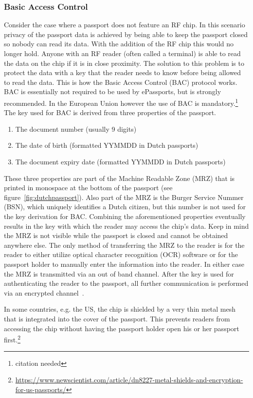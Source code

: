 \subsubsection{Basic Access Control}
Consider the case where a passport does not feature an RF chip. In this scenario privacy of the passport data is achieved by being able to keep the passport closed so nobody can read its data. With the addition of the RF chip this would no longer hold. Anyone with an RF reader (often called a terminal) is able to read the data on the chip if it is in close proximity. The solution to this problem is to protect the data with a key that the reader needs to know before being allowed to read the data. This is how the Basic Access Control (BAC) protocol works. BAC is essentially not required to be used by ePassports, but is strongly recommended. In the European Union however the use of BAC is mandatory.\footnote{citation needed} The key used for BAC is derived from three properties of the passport.
\begin{enumerate}
	\item The document number (usually 9 digits)
  \item The date of birth (formatted YYMMDD in Dutch passports)
  \item The document expiry date (formatted YYMMDD in Dutch passports)
\end{enumerate}
These three properties are part of the Machine Readable Zone (MRZ) that is printed in monospace at the bottom of the passport (see figure~\ref{fig:dutchpassport}). Also part of the MRZ is the Burger Service Nummer (BSN), which uniquely identifies a Dutch citizen, but this number is not used for the key derivation for BAC. Combining the aforementioned properties eventually results in the key with which the reader may access the chip's data. Keep in mind the MRZ is not visible while the passport is closed and cannot be obtained anywhere else. The only method of transferring the MRZ to the reader is for the reader to either utilize optical character recognition (OCR) software or for the passport holder to manually enter the information into the reader. In either case the MRZ is transmitted via an out of band channel. After the key is used for authenticating the reader to the passport, all further communication is performed via an encrypted channel~\cite{icao}.

In some countries, e.g. the US, the chip is shielded by a very thin metal mesh that is integrated into the cover of the passport. This prevents readers from accessing the chip without having the passport holder open his or her passport first.\footnote{\url{https://www.newscientist.com/article/dn8227-metal-shields-and-encryption-for-us-passports/}}

